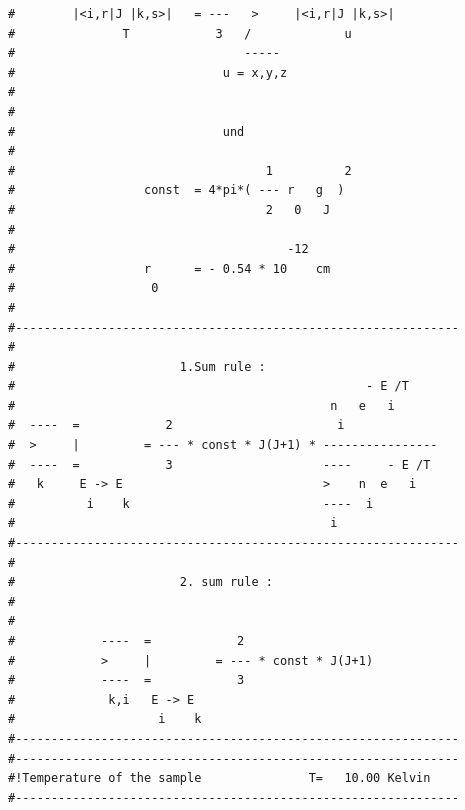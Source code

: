 \begin{enumerate}
{\begin{verbatim}
#        |<i,r|J |k,s>|   = ---   >     |<i,r|J |k,s>|         
#               T            3   /             u               
#                                -----                         
#                             u = x,y,z                        
#                                                              
#                                                              
#                             und                              
#                                                              
#                                   1          2               
#                  const  = 4*pi*( --- r   g  )                
#                                   2   0   J                  
#                                                              
#                                      -12                     
#                  r      = - 0.54 * 10    cm                  
#                   0                                          
#                                                              
#--------------------------------------------------------------
#                                                              
#                       1.Sum rule :                           
#                                                 - E /T       
#                                            n   e   i         
#  ----  =            2                       i                
#  >     |         = --- * const * J(J+1) * ----------------   
#  ----  =            3                     ----     - E /T    
#   k     E -> E                            >    n  e   i      
#          i    k                           ----  i            
#                                            i                 
#--------------------------------------------------------------
#                                                              
#                       2. sum rule :                          
#                                                              
#                                                              
#            ----  =            2                              
#            >     |         = --- * const * J(J+1)            
#            ----  =            3                              
#             k,i   E -> E                                     
#                    i    k                                    
#-------------------------------------------------------------- 
#-------------------------------------------------------------- 
#!Temperature of the sample               T=   10.00 Kelvin         
#-------------------------------------------------------------- 

\end{verbatim}}
\end{enumerate}
